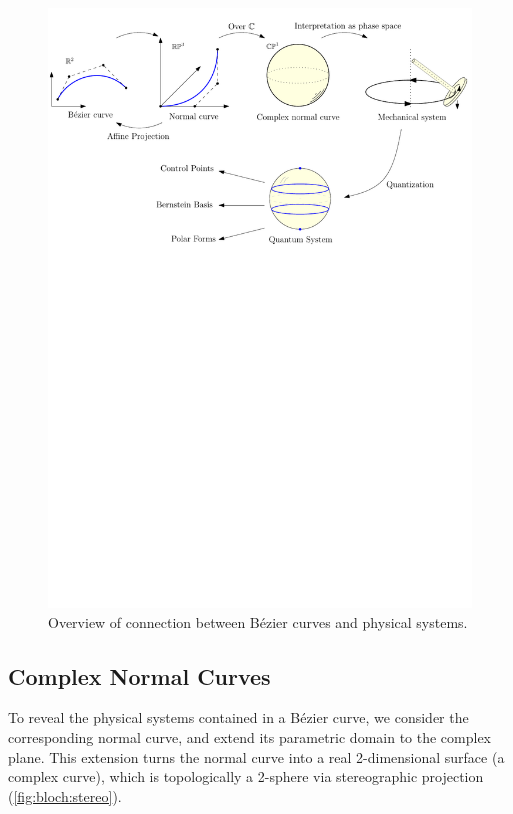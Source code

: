 \documentclass[12pt,final,3p]{elsarticle}
\begin{document}
\begin{figure}[h]
	\centering
	\includegraphics[width=\textwidth, keepaspectratio]{figures/outline2.pdf}
	\caption{Overview of connection between B\'{e}zier curves and physical systems.}
	\label{fig:outline}
\end{figure}

\subsection{Complex Normal Curves}\label{sec:bezier2physics:Cnormal}
To reveal the physical systems contained in a B\'{e}zier curve, we  consider the corresponding normal curve, and extend its parametric domain to the complex plane. This extension turns the normal curve into a real 2-dimensional surface (a complex curve), which is topologically a 2-sphere via stereographic projection (\autoref{fig:bloch:stereo}).
\end{document}
